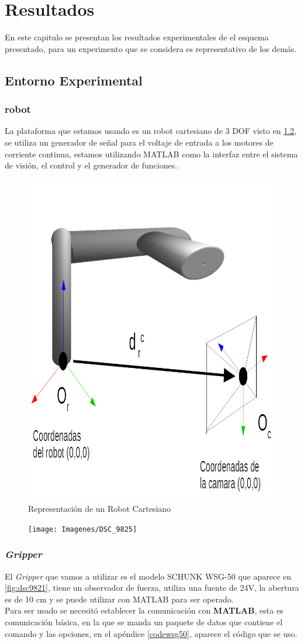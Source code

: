 \chapter{Resultados}
En este capitulo se presentan los resultados experimentales de el esquema presentado, para un experimento que se considera es representativo de los demás.


\section{Entorno Experimental}



\subsection{robot}
La plataforma que estamos usando es un robot cartesiano de 3 DOF visto en  \cref{fig:dsc9825}, se utiliza un generador de señal para el voltaje de entrada a los motores de corriente continua, estamos utilizando MATLAB como la interfaz entre el sistema de visión, el control y el generador de funciones.
\begin{figure}
	\centering
	\includegraphics[width=0.5\linewidth]{visio/visio3/coordenadasrobcam2}
	\caption{Representación de un Robot Cartesiano}
	\label{fig:coordenadasrobcam}
\end{figure}



\begin{figure}
	\centering
	\texttt{[image: Imagenes/DSC\_9825]}
	\caption{}
	\label{fig:dsc9825}
\end{figure}

\clearpage

\subsection{\textit{Gripper}}
El \textit{Gripper} que vamos a utilizar es el modelo SCHUNK WSG-50 que aparece en \cref{fig:dsc9821}, tiene un observador de fuerza, utiliza una fuente de 24V, la abertura es de 10 cm y se puede utilizar con MATLAB para ser operado. \\
Para ser usado se necesitó establecer la comunicación con \textbf{MATLAB}, esta es comunicación básica, en la que se manda un paquete de datos que contiene el comando y las opciones, en el apéndice \ref{codewsg50}, aparece el código que se uso.

